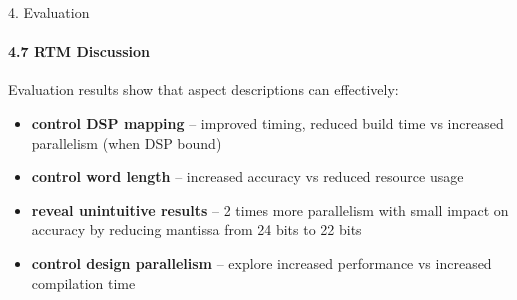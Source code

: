 \begin{frame}{4. Evaluation}
  \framesubtitle{4.7 RTM Discussion}
  Evaluation results show that aspect descriptions can effectively:
  \begin{itemize}
    \setlength{\itemsep}{10pt}
  \item \textbf{control DSP mapping} -- improved timing, reduced build time vs
    increased parallelism (when DSP bound)
  \item \textbf{control word length} -- increased accuracy vs reduced
    resource usage
  \item \textbf{reveal unintuitive results} -- 2 times more
    parallelism with small impact on accuracy by reducing mantissa
    from 24 bits to 22 bits
  \item \textbf{control design parallelism} -- explore increased
    performance vs increased compilation time
  \end{itemize}
\end{frame}

\begin{comment}
  \begin{frame}{4. Evaluation: Reverse Time Migration}
    \begin{table}
    \end{table}
  \end{frame}
\end{comment}

